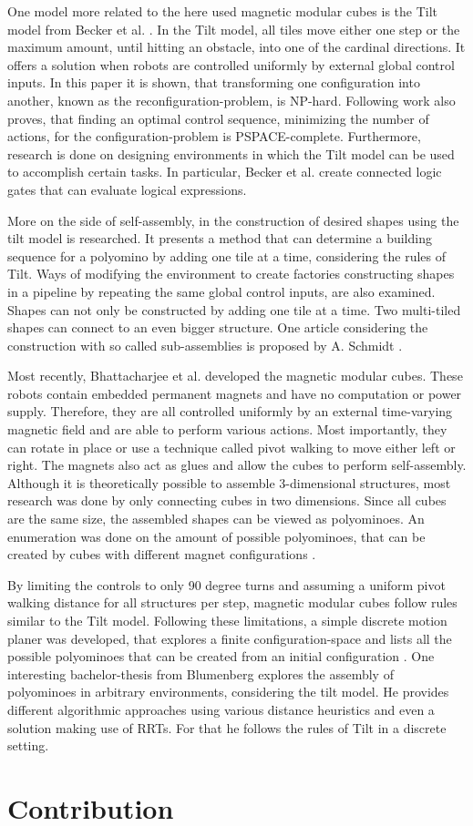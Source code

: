 One model more related to the here used magnetic modular cubes is the Tilt model from Becker et al. \cite{Becker2014_SP}.
In the Tilt model, all tiles move either one step or the maximum amount, until hitting an obstacle, into one of the cardinal directions.
It offers a solution when robots are controlled uniformly by external global control inputs.
In this paper it is shown, that transforming one configuration into another, known as the reconfiguration-problem, is NP-hard.
Following work \cite{Becker2014} also proves, that finding an optimal control sequence, minimizing the number of actions, for the configuration-problem is PSPACE-complete.
Furthermore, research is done on designing environments in which the Tilt model can be used to accomplish certain tasks.
In particular, Becker et al. \cite{Becker2014} create connected logic gates that can evaluate logical expressions.

More on the side of self-assembly, in \cite{Becker2020} the construction of desired shapes using the tilt model is researched.
It presents a method that can determine a building sequence for a polyomino by adding one tile at a time, considering the rules of Tilt.
Ways of modifying the environment to create factories constructing shapes in a pipeline by repeating the same global control inputs, are also examined.
Shapes can not only be constructed by adding one tile at a time.
Two multi-tiled shapes can connect to an even bigger structure.
One article considering the construction with so called sub-assemblies is proposed by A. Schmidt \cite{Schmidt2018}.

Most recently, Bhattacharjee et al. \cite{Bhattacharjee2022} developed the magnetic modular cubes.
These robots contain embedded permanent magnets and have no computation or power supply.
Therefore, they are all controlled uniformly by an external time-varying magnetic field and are able to perform various actions.
Most importantly, they can rotate in place or use a technique called pivot walking to move either left or right.
The magnets also act as glues and allow the cubes to perform self-assembly.
Although it is theoretically possible to assemble 3-dimensional structures, most research was done by only connecting cubes in two dimensions.
Since all cubes are the same size, the assembled shapes can be viewed as polyominoes.
An enumeration was done on the amount of possible polyominoes, that can be created by cubes with different magnet configurations \cite{Lu2021}.

By limiting the controls to only 90 degree turns and assuming a uniform pivot walking distance for all structures per step, magnetic modular cubes follow rules similar to the Tilt model.
Following these limitations, a simple discrete motion planer was developed, that explores a finite configuration-space and lists all the possible polyominoes that can be created from an initial configuration \cite{Bhattacharjee2022}.
One interesting bachelor-thesis from Blumenberg \cite{Blumenberg2022} explores the assembly of polyominoes in arbitrary environments, considering the tilt model.
He provides different algorithmic approaches using various distance heuristics and even a solution making use of RRTs.
For that he follows the rules of Tilt in a discrete setting.


\section{Contribution}
